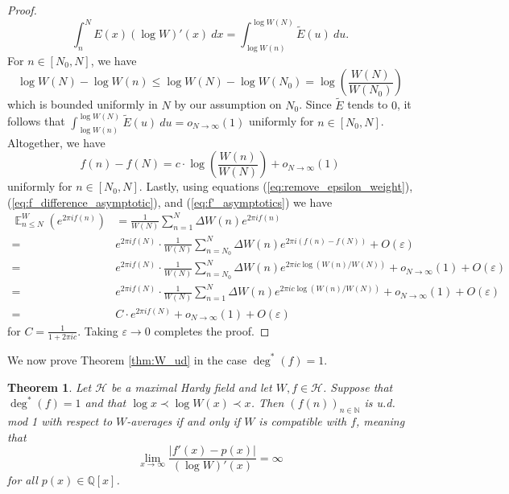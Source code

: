 \documentclass[12pt]{article}
\theoremstyle{plain} %
\newtheorem{theorem}{Theorem}[section]
\theoremstyle{definition} %
\theoremstyle{plain}
\theoremstyle{plain}
\numberwithin{equation}{section}
\newcommand{\N}{\mathbb{N}}
\newcommand{\Q}{\mathbb{Q}}
\renewcommand{\epsilon}{\varepsilon}
\renewcommand{\leq}{\leqslant}
\newcommand{\1}{\mathbbm{1}}
\newcommand{\E}{\operatorname{\mathbb{E}}}
\newcommand{\oo}{\infty}
\begin{document}
\begin{proof}
\[
\int_n^NE(x)(\log W)'(x)~dx = \int_{\log W(n)}^{\log W(N)}\tilde{E}(u)~du.
\]
For $n\in [N_0,N]$, we have 
\[
\log W(N)-\log W(n) \leq \log W(N)-\log W(N_0) =  \log\left(\frac{W(N)}{W(N_0)}\right)
\]
which is bounded uniformly in $N$ by our assumption on $N_0$. Since $\tilde{E}$ tends to $0$, it follows that $\int_{\log W(n)}^{\log W(N)}\tilde{E}(u)~du = o_{N\to\oo}(1)$ uniformly for $n\in [N_0,N]$. Altogether, we have 
\begin{equation}\label{eq:f_difference_asymptotic}
f(n)-f(N) = c\cdot \log\left(\frac{W(n)}{W(N)}\right)+o_{N\to\oo}(1)
\end{equation}
uniformly for $n\in [N_0,N]$. Lastly, using equations (\ref{eq:remove_epsilon_weight}), (\ref{eq:f_difference_asymptotic}), and (\ref{eq:f'_asymptotics}) we have
\begin{align*}
    \E_{n\leq N}^W(e^{2\pi i f(n)}) &= \frac{1}{W(N)}\sum_{n=1}^{N}\Delta W(n)e^{2\pi i f(n)}\\ =& e^{2\pi i f(N)}\cdot \frac{1}{W(N)}\sum_{n=N_0}^{N}\Delta W(n)e^{2\pi i (f(n)-f(N))}+O(\epsilon)\\
    =&e^{2\pi i f(N)}\cdot \frac{1}{W(N)}\sum_{n=N_0}^{N}\Delta W(n)e^{2\pi i c\log(W(n)/W(N))}+o_{N\to\oo}(1)+O(\epsilon)\\
    =&e^{2\pi i f(N)}\cdot \frac{1}{W(N)}\sum_{n=1}^{N}\Delta W(n)e^{2\pi i c\log(W(n)/W(N))}+o_{N\to\oo}(1)+O(\epsilon)\\
    =&C\cdot e^{2\pi i f(N)}+o_{N\to\oo}(1)+O(\epsilon)
\end{align*}
for $C= \frac{1}{1+2\pi i c}$. Taking $\epsilon\to 0$ completes the proof.
\end{proof}
We now prove Theorem \ref{thm:W_ud} in the case $\deg^*(f)=1$.
\begin{theorem}\label{thm:d=1_thm}
    Let $\mathcal{H}$ be a maximal Hardy field and let $W,f\in \mathcal{H}$. Suppose that $\deg^*(f)=1$ and that $\log x\prec \log W(x)\prec x$. Then $(f(n))_{n\in \N}$ is u.d. mod 1 with respect to $W$-averages if and only if $W$ is compatible with $f$, meaning that 
\begin{equation}\label{eq:d=1_bosh_condition_again}
         \lim_{x\to\oo}\frac{|f'(x)-p(x)|}{(\log W)'(x)}=\oo
\end{equation}
for all $p(x)\in \Q[x]$. 
\end{theorem}
\end{document}

